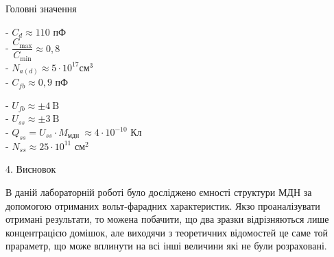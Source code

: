 \documentclass[a4paper,14pt]{extreport}
\begin{document}
\begin{center}
Головні значення
\end{center}

\begin{minipage}{0.4\textwidth}
  - $C_{d} \approx 110$ пФ\\

- $\dfrac{C_{\max }}{C_{\min }}\approx 0,8$\\

- $N_{a(d)}\approx 5 \cdot 10^{17} \text{см}^{3}$\\

- $C_{f b} \approx 0,9$ пФ\\
\end{minipage}
\hfill
\begin{minipage}{0.4\textwidth}
 - $U_{f b}\approx \pm 4 \mathrm{~B}$\\

- $U_{s s}\approx\pm 3 \mathrm{~B}$\\

- $Q_{s s}=U_{s s} \cdot M_{\text {мдн }}\approx 4 \cdot 10^{-10}$ Кл\\

- $N_{s s}\approx25 \cdot 10^{11} \text{ см}^{2}$\\
\end{minipage}






\clearpage
\begin{center}4. Висновок\\ \end{center}
	В даній лабораторній роботі було досліджено ємності структури МДН за допомогою отриманих вольт-фарадних характеристик. Якзо проаналізувати отримані результати, то можена побачити, що два зразки відрізняються 
	лише концентрацією домішок, але виходячи з теоретичних відомостей це саме той прараметр, що може вплинути на всі інші величини які не були розраховані.
\end{document}
